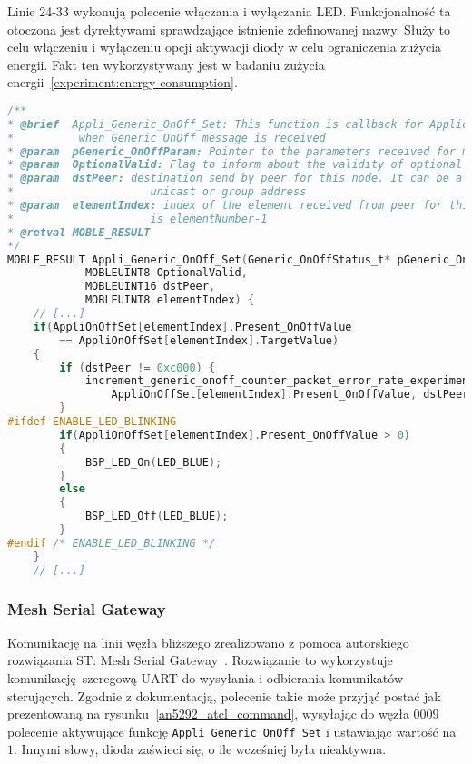 Linie 24-33 wykonują polecenie włączania i wyłączania \gls{LED}. Funkcjonalność ta otoczona jest
dyrektywami sprawdzające istnienie zdefinowanej nazwy. Służy to celu włączeniu i wyłączeniu
opcji aktywacji diody w celu ograniczenia zużycia energii. Fakt ten wykorzystywany jest
w badaniu zużycia energii~\ref{experiment:energy-consumption}.


\begin{lstlisting}[language=C,
    caption={Inkrementacja licznika realizowana jest poprzez dostosowanie funkcji odpowiadającej na zdarzenie},
    label={lst:increment-counter}]
/**
* @brief  Appli_Generic_OnOff_Set: This function is callback for Application
*          when Generic OnOff message is received
* @param  pGeneric_OnOffParam: Pointer to the parameters received for message
* @param  OptionalValid: Flag to inform about the validity of optional parameters 
* @param  dstPeer: destination send by peer for this node. It can be a
*                     unicast or group address 
* @param  elementIndex: index of the element received from peer for this node which
*                     is elementNumber-1
* @retval MOBLE_RESULT
*/ 
MOBLE_RESULT Appli_Generic_OnOff_Set(Generic_OnOffStatus_t* pGeneric_OnOffParam, 
			MOBLEUINT8 OptionalValid,
			MOBLEUINT16 dstPeer,
			MOBLEUINT8 elementIndex) {
	// [...]
	if(AppliOnOffSet[elementIndex].Present_OnOffValue 
		== AppliOnOffSet[elementIndex].TargetValue)
	{
		if (dstPeer != 0xc000) {
			increment_generic_onoff_counter_packet_error_rate_experiment(
				AppliOnOffSet[elementIndex].Present_OnOffValue, dstPeer);
		}
#ifdef ENABLE_LED_BLINKING
		if(AppliOnOffSet[elementIndex].Present_OnOffValue > 0)
		{
			BSP_LED_On(LED_BLUE);
		}
		else
		{
			BSP_LED_Off(LED_BLUE);
		}
#endif /* ENABLE_LED_BLINKING */
	}
	// [...]
\end{lstlisting}

\subsubsection{Mesh Serial Gateway}\label{mesh:serial-gateway}
Komunikację na linii węzła bliższego zrealizowano z pomocą autorskiego rozwiązania ST: Mesh Serial Gateway~\cite{st_an5292_2021}.
Rozwiązanie to wykorzystuje komunikację szeregową \gls{UART} do wysyłania i odbierania komunikatów sterujących.
Zgodnie z dokumentacją, polecenie takie może przyjąć postać jak prezentowaną na rysunku~\ref{an5292_atcl_command}, wysyłając do węzła $0009$
polecenie aktywujące funkcję \texttt{Appli\_Generic\_OnOff\_Set} i ustawiając wartość na $1$. Innymi słowy, dioda zaświeci
się, o ile wcześniej była nieaktywna.

